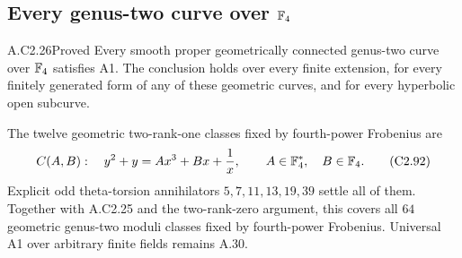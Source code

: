 \subsection{Every genus-two curve over \texorpdfstring{$\mathbb F_4$}{F4}}

\begin{claim}{A.C2.26}{Proved}
Every smooth proper geometrically connected
genus-two curve over $\mathbb F_4$ satisfies A1.
The conclusion holds over every finite
extension, for every finitely generated
form of any of these geometric curves,
and for every hyperbolic open subcurve.

The twelve geometric two-rank-one classes
fixed by fourth-power Frobenius are
\[
 C(A,B):\quad y^2+y=Ax^3+Bx+\frac1x,
 \qquad A\in\mathbb F_4^*,\quad B\in\mathbb F_4.                         \tag{C2.92}
\]
Explicit odd theta-torsion annihilators
$5,7,11,13,19,39$ settle all of them.
Together with A.C2.25 and the two-rank-zero
argument, this covers all $64$ geometric
genus-two moduli classes fixed by
fourth-power Frobenius. Universal A1
over arbitrary finite fields remains A.30.
\end{claim}
